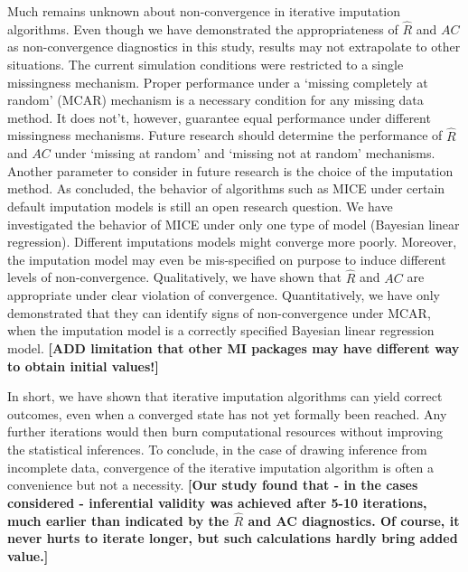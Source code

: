 \documentclass[Royal,times,sageh]{sagej}
\begin{document}
Much remains unknown about non-convergence in iterative imputation algorithms. Even though we have demonstrated the appropriateness of \(\widehat{R}\) and \(AC\) as non-convergence diagnostics in this study, results may not extrapolate to other situations. The current simulation conditions were restricted to a single missingness mechanism. Proper performance under a `missing completely at random' (MCAR) mechanism is a necessary condition for any missing data method. It does not't, however, guarantee equal performance under different missingness mechanisms. Future research should determine the performance of \(\widehat{R}\) and \(AC\) under `missing at random' and `missing not at random' mechanisms.
Another parameter to consider in future research is the choice of the imputation method. As \citet{murr18} concluded, the behavior of algorithms such as MICE under certain default imputation models is still an open research question. We have investigated the behavior of MICE under only one type of model (Bayesian linear regression). Different imputations models might converge more poorly. Moreover, the imputation model may even be mis-specified on purpose to induce different levels of non-convergence. Qualitatively, we have shown that \(\widehat{R}\) and \(AC\) are appropriate under clear violation of convergence. Quantitatively, we have only demonstrated that they can identify signs of non-convergence under MCAR, when the imputation model is a correctly specified Bayesian linear regression model. \textbf{{[}ADD limitation that other MI packages may have different way to obtain initial values!{]}} \newline \newline

\noindent In short, we have shown that iterative imputation algorithms can yield correct outcomes, even when a converged state has not yet formally been reached. Any further iterations would then burn computational resources without improving the statistical inferences. To conclude, in the case of drawing inference from incomplete data, convergence of the iterative imputation algorithm is often a convenience but not a necessity. \textbf{{[}Our study found that - in the cases considered - inferential validity was achieved after 5-10 iterations, much earlier than indicated by the \(\widehat{R}\) and AC diagnostics. Of course, it never hurts to iterate longer, but such calculations hardly bring added value.{]}}



\end{document}
